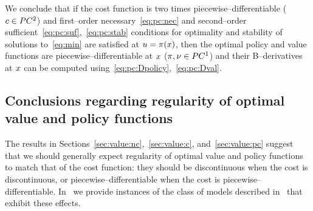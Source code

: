 \documentclass{article}
\begin{document}
We conclude that if the cost function is two times piecewise--differentiable ($c\in PC^2$) and first--order necessary~\eqref{eq:pc:nec} and second--order sufficient~\eqref{eq:pc:suf},~\eqref{eq:pc:stab} conditions for optimality and stability of solutions to~\eqref{eq:min} are satisfied at $u = \pi(x)$, then the optimal policy and value functions are piecewise--differentiable at $x$ ($\pi,\nu\in PC^1$) and their B--derivatives at $x$ can be computed using~\eqref{eq:pc:Dpolicy},~\eqref{eq:pc:Dval}.


\subsection{Conclusions regarding regularity of optimal value and policy functions}
The results in Sections~\ref{sec:value:nc},~\ref{sec:value:c}, and~\ref{sec:value:pc} suggest that we should generally expect regularity of optimal value and policy functions to match that of the cost function:  they should be discontinuous when the cost is discontinuous, or piecewise--differentiable when the cost is piecewise--differentiable.
In~ we provide instances of the class of models described in~ that exhibit these effects. 
\end{document}
